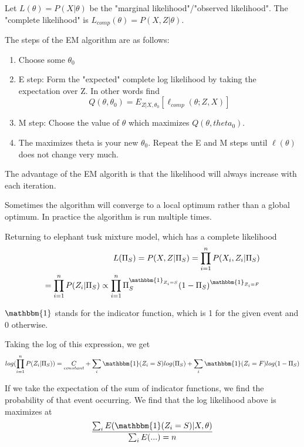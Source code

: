 \documentclass[12pt]{report}
\begin{document}
Let $L(\theta) = P(X|\theta)$ be the "marginal likelihood"/"observed likelihood". The "complete likelihood" is $L_{comp}(\theta) = P(X,Z|\theta)$. 

The steps of the EM algorithm are as follows:
\begin{enumerate}

\item Choose some $\theta_0$

\item E step: Form the "expected" complete log likelihood by taking the expectation over Z. In other words find \begin{equation}
Q(\theta,\theta_0) = E_{Z|X,\theta_0}[\ell_{comp}(\theta;Z,X)]
\end{equation}

\item M step: Choose the value of $\theta$ which maximizes $Q(\theta,theta_0)$.

\item The maximizes theta is your new $\theta_0$. Repeat the E and M steps until $\ell(\theta)$ does not change very much.
\end{enumerate}

The advantage of the EM algorith is that the likelihood will always increase with each iteration.

Sometimes the algorithm will converge to a local optimum rather than a global optimum. In practice the algorithm is run multiple times.

Returning to elephant tusk mixture model, which has a complete likelihood \begin{equation}
\begin{aligned}
L(\Pi_S) = P(X,Z|\Pi_S) = \prod_{i=1}^{n}P(X_i,Z_i|\Pi_S) \\
 = \prod_{i=1}^{n}P(Z_i|\Pi_S)
 \propto \prod_{i=1}^{n}\Pi_S^{\mathbbm{1}_{Z_i=S}}(1-\Pi_S)^{\mathbbm{1}_{Z_i=F}}
\end{aligned}
\end{equation}

$\mathbbm{1}$ stands for the indicator function, which is 1 for the given event and 0 otherwise.

Taking the log of this expression, we get
\begin{equation}
log(\prod_{i=1}^{n}P(Z_i|\Pi_S)) = \underset{ constant}{C} + \sum_i \mathbbm{1}(Z_i=S)log(\Pi_S) + \sum_i \mathbbm{1}(Z_i=F)log(1-\Pi_S)
\end{equation}

If we take the expectation of the sum of indicator functions, we find the probability of that event occurring. We find that the log likelihood above is maximizes at
\begin{equation}
\frac{\sum_i E(\mathbbm{1}(Z_i=S)|X,\theta)}{\sum_i E(...) = n}
\end{equation}
\end{document}
